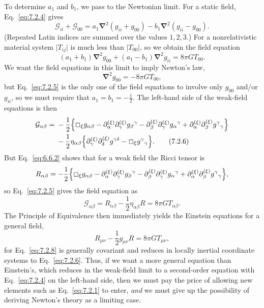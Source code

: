 To determine \(a_1\) and \(b_1\), we pass to the Newtonian limit. For a
static field, Eq.~\eqref{eq:7.2.4} gives
\[
  \mathcal G_{ii}+\mathcal G_{00}
  =
  a_1\boldsymbol{\nabla}^2(g_{ii}+g_{00})
  -b_1\boldsymbol{\nabla}^2(g_{ii}-g_{00}).
\]
(Repeated Latin indices are summed over the values \(1,2,3\).) For a
nonrelativistic material system \(\lvert T_{ij}\rvert\) is much less than
\(\lvert T_{00}\rvert\), so we obtain the field equation
\begin{equation}
  (a_1+b_1)\boldsymbol{\nabla}^2g_{00}
  +(a_1-b_1)\boldsymbol{\nabla}^2g_{ii}
  =
  8\pi G T_{00}.
  \tag{7.2.5}\label{eq:7.2.5}
\end{equation}
We want the field equations in this limit to imply Newton's law,
\[
  \boldsymbol{\nabla}^2g_{00}=-8\pi G T_{00},
\]
but Eq.~\eqref{eq:7.2.5} is the only one of the field equations to involve
only \(g_{00}\) and/or \(g_{ii}\), so we must require that
\(a_1=b_1=-\frac12\). The left-hand side of the weak-field equations is then
\begin{align}
  \mathcal G_{\alpha\beta}
  ={}&
  -\frac12\Bigl\{
    \Box_\xi g_{\alpha\beta}
    -\partial^{(\xi)}_\alpha\partial^{(\xi)}_\gamma g_\beta{}^\gamma
    -\partial^{(\xi)}_\beta\partial^{(\xi)}_\gamma g_\alpha{}^\gamma
    +\partial^{(\xi)}_\alpha\partial^{(\xi)}_\beta g^\gamma{}_\gamma
  \Bigr\}
  \notag\\
  &-
  \frac12\eta_{\alpha\beta}\Bigl\{
    \partial^{(\xi)}_\gamma\partial^{(\xi)}_\delta g^{\gamma\delta}
    -\Box_\xi g^\gamma{}_\gamma
  \Bigr\}.
  \tag{7.2.6}\label{eq:7.2.6}
\end{align}
But Eq.~\eqref{eq:6.6.2} shows that for a weak field the Ricci tensor is
\[
  R_{\alpha\beta}
  =
  -\frac12\Bigl\{
    \Box_\xi g_{\alpha\beta}
    -\partial^{(\xi)}_\alpha\partial^{(\xi)}_\gamma g_\beta{}^\gamma
    -\partial^{(\xi)}_\beta\partial^{(\xi)}_\gamma g_\alpha{}^\gamma
    +\partial^{(\xi)}_\alpha\partial^{(\xi)}_\beta g^\gamma{}_\gamma
  \Bigr\},
\]
so Eq.~\eqref{eq:7.2.5} gives the field equation as
\begin{equation}
  \mathcal G_{\alpha\beta}
  =
  R_{\alpha\beta}
  -\frac12\eta_{\alpha\beta}R
  =
  8\pi G T_{\alpha\beta}.
  \tag{7.2.7}\label{eq:7.2.7}
\end{equation}
The Principle of Equivalence then immediately yields the Einstein equations
for a general field,
\begin{equation}
  R_{\mu\nu}-\frac12g_{\mu\nu}R
  =
  8\pi G T_{\mu\nu},
  \tag{7.2.8}\label{eq:7.2.8}
\end{equation}
for Eq.~\eqref{eq:7.2.8} is generally covariant and reduces in locally
inertial coordinate systems to Eq.~\eqref{eq:7.2.6}. Thus, if we want a more
general equation than Einstein's, which reduces in the weak-field limit to a
second-order equation with Eq.~\eqref{eq:7.2.4} on the left-hand side, then
we must pay the price of allowing new elements such as
Eq.~\eqref{eq:7.2.1} to enter, \emph{and} we must give up the possibility of
deriving Newton's theory as a limiting case.
